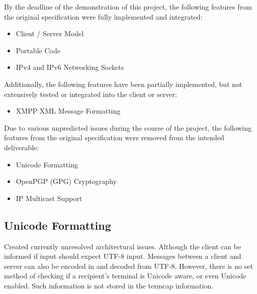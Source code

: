 
By the deadline of the demonstration of this project, the following
features from the original specification were fully implemented and
integrated:

\begin{itemize}

\item Client / Server Model

\item Portable Code

\item IPv4 and IPv6 Networking Sockets

\end{itemize}

Additionally, the following features have been partially implemented,
but not extensively tested or integrated into the client or server:

\begin{itemize}

\item XMPP XML Message Formatting

\end{itemize}


Due to various unpredicted issues during the course of the project, the
following features from the original specification were removed from the
intended deliverable:

\begin{itemize}

\item Unicode Formatting

\item OpenPGP (GPG) Cryptography

\item IP Multicast Support

\end{itemize}


\subsection{Unicode Formatting}

Created currently unresolved architectural issues. Although
the client can be informed if input should expect UTF-8 input. 
Messages between a client and server can also be encoded in and
decoded from UTF-8. However, there is no set method of checking if a
recipient's terminal is Unicode aware, or even Unicode enabled. Such
information is not stored in the termcap information.

